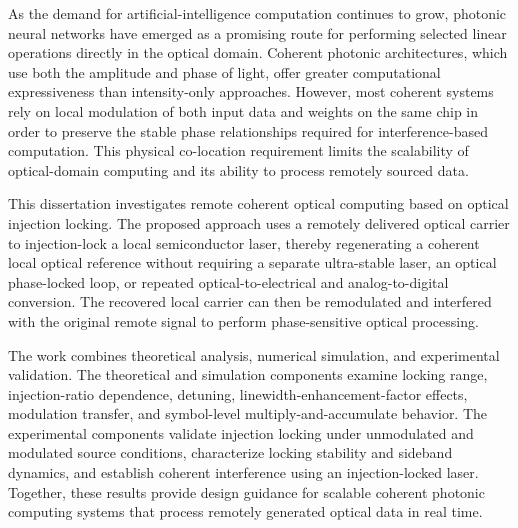 As the demand for artificial-intelligence computation continues to grow, photonic neural networks have emerged as a promising route for performing selected linear operations directly in the optical domain. Coherent photonic architectures, which use both the amplitude and phase of light, offer greater computational expressiveness than intensity-only approaches. However, most coherent systems rely on local modulation of both input data and weights on the same chip in order to preserve the stable phase relationships required for interference-based computation. This physical co-location requirement limits the scalability of optical-domain computing and its ability to process remotely sourced data.

This dissertation investigates remote coherent optical computing based on optical injection locking. The proposed approach uses a remotely delivered optical carrier to injection-lock a local semiconductor laser, thereby regenerating a coherent local optical reference without requiring a separate ultra-stable laser, an optical phase-locked loop, or repeated optical-to-electrical and analog-to-digital conversion. The recovered local carrier can then be remodulated and interfered with the original remote signal to perform phase-sensitive optical processing.

The work combines theoretical analysis, numerical simulation, and experimental validation. The theoretical and simulation components examine locking range, injection-ratio dependence, detuning, linewidth-enhancement-factor effects, modulation transfer, and symbol-level multiply-and-accumulate behavior. The experimental components validate injection locking under unmodulated and modulated source conditions, characterize locking stability and sideband dynamics, and establish coherent interference using an injection-locked laser. Together, these results provide design guidance for scalable coherent photonic computing systems that process remotely generated optical data in real time.
